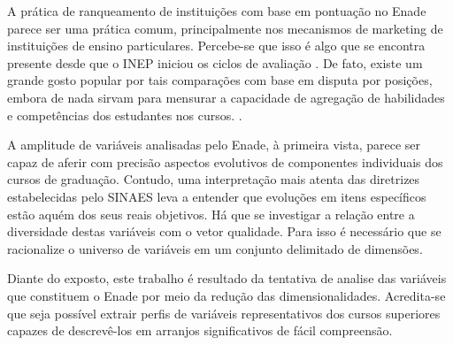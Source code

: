 



A prática de ranqueamento de instituições com base em pontuação no Enade parece ser uma prática comum, principalmente nos mecanismos de marketing de instituições de ensino particulares. Percebe-se que isso é algo que se encontra presente desde que o INEP iniciou os ciclos de avaliação \cite[p.~294]{Verhine_Dantas_Soares_2006}. De fato, existe um grande gosto popular por tais comparações com base em disputa por posições, embora de nada sirvam para mensurar a capacidade de agregação de habilidades e competências dos estudantes nos cursos. \cite[p.~847]{Brito_Regina_2008}.


A amplitude de variáveis analisadas pelo Enade, à primeira vista, parece ser capaz de aferir com precisão aspectos evolutivos de componentes individuais dos cursos de graduação. Contudo, uma interpretação mais atenta das diretrizes estabelecidas pelo SINAES leva a entender que evoluções em itens específicos estão aquém dos seus reais objetivos. Há que se investigar a relação entre a diversidade destas variáveis com o vetor qualidade. Para isso é necessário que se racionalize o universo de variáveis em um conjunto delimitado de dimensões.

Diante do exposto, este trabalho é resultado da tentativa de analise das variáveis que constituem o Enade por meio da redução das dimensionalidades. Acredita-se que seja possível extrair perfis de variáveis representativos dos cursos superiores capazes de descrevê-los em arranjos significativos de fácil compreensão.

